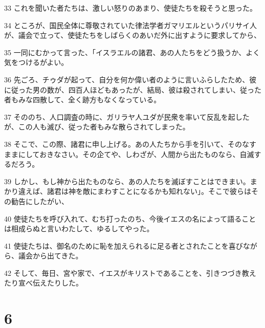 \par 33 これを聞いた者たちは、激しい怒りのあまり、使徒たちを殺そうと思った。
\par 34 ところが、国民全体に尊敬されていた律法学者ガマリエルというパリサイ人が、議会で立って、使徒たちをしばらくのあいだ外に出すように要求してから、
\par 35 一同にむかって言った、「イスラエルの諸君、あの人たちをどう扱うか、よく気をつけるがよい。
\par 36 先ごろ、チゥダが起って、自分を何か偉い者のように言いふらしたため、彼に従った男の数が、四百人ほどもあったが、結局、彼は殺されてしまい、従った者もみな四散して、全く跡方もなくなっている。
\par 37 そののち、人口調査の時に、ガリラヤ人ユダが民衆を率いて反乱を起したが、この人も滅び、従った者もみな散らされてしまった。
\par 38 そこで、この際、諸君に申し上げる。あの人たちから手を引いて、そのなすままにしておきなさい。その企てや、しわざが、人間から出たものなら、自滅するだろう。
\par 39 しかし、もし神から出たものなら、あの人たちを滅ぼすことはできまい。まかり違えば、諸君は神を敵にまわすことになるかも知れない」。そこで彼らはその勧告にしたがい、
\par 40 使徒たちを呼び入れて、むち打ったのち、今後イエスの名によって語ることは相成らぬと言いわたして、ゆるしてやった。
\par 41 使徒たちは、御名のために恥を加えられるに足る者とされたことを喜びながら、議会から出てきた。
\par 42 そして、毎日、宮や家で、イエスがキリストであることを、引きつづき教えたり宣べ伝えたりした。

\chapter{6}

